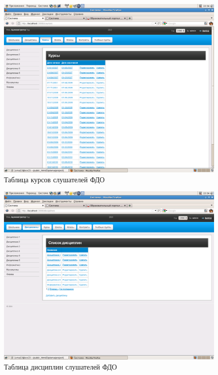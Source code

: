 \begin{figure}
\begin{center}
\includegraphics[scale=0.25]{image/cources.png}
\caption{Таблица курсов слушателей ФДО}
\end{center}
\end{figure}

\begin{figure}
\begin{center}
\includegraphics[scale=0.25]{image/disciplines.png}
\caption{Таблица дисциплин слушателей ФДО}
\end{center}
\end{figure}

